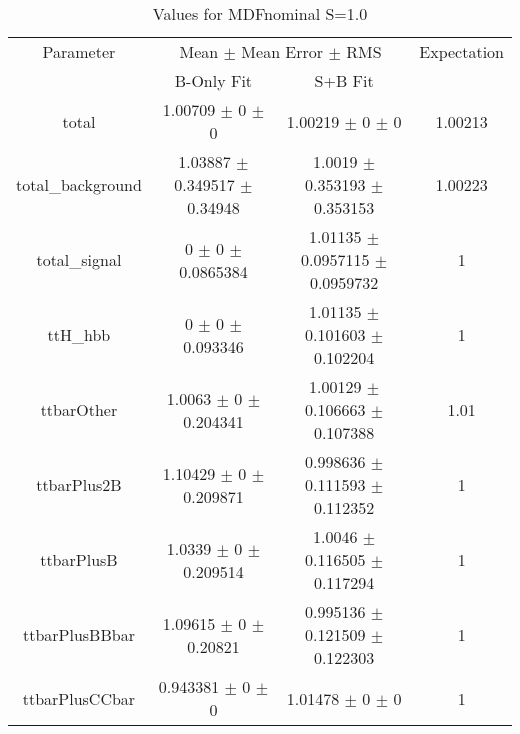 \begin{table}
\centering
\caption{Values for MDFnominal S=1.0}
\begin{tabular}{cccc}
\toprule
Parameter & \multicolumn{2}{c}{Mean $\pm$ Mean Error $\pm$ RMS} & Expectation\\
 & B-Only Fit & S+B Fit & \\
\midrule
total & \num{1.00709} $\pm$ \num{0} $\pm$ \num{0} & \num{1.00219} $\pm$ \num{0} $\pm$ \num{0} & \num{1.00213}\\
total\_background & \num{1.03887} $\pm$ \num{0.349517} $\pm$ \num{0.34948} & \num{1.0019} $\pm$ \num{0.353193} $\pm$ \num{0.353153} & \num{1.00223}\\
total\_signal & \num{0} $\pm$ \num{0} $\pm$ \num{0.0865384} & \num{1.01135} $\pm$ \num{0.0957115} $\pm$ \num{0.0959732} & \num{1}\\
ttH\_hbb & \num{0} $\pm$ \num{0} $\pm$ \num{0.093346} & \num{1.01135} $\pm$ \num{0.101603} $\pm$ \num{0.102204} & \num{1}\\
ttbarOther & \num{1.0063} $\pm$ \num{0} $\pm$ \num{0.204341} & \num{1.00129} $\pm$ \num{0.106663} $\pm$ \num{0.107388} & \num{1.01}\\
ttbarPlus2B & \num{1.10429} $\pm$ \num{0} $\pm$ \num{0.209871} & \num{0.998636} $\pm$ \num{0.111593} $\pm$ \num{0.112352} & \num{1}\\
ttbarPlusB & \num{1.0339} $\pm$ \num{0} $\pm$ \num{0.209514} & \num{1.0046} $\pm$ \num{0.116505} $\pm$ \num{0.117294} & \num{1}\\
ttbarPlusBBbar & \num{1.09615} $\pm$ \num{0} $\pm$ \num{0.20821} & \num{0.995136} $\pm$ \num{0.121509} $\pm$ \num{0.122303} & \num{1}\\
ttbarPlusCCbar & \num{0.943381} $\pm$ \num{0} $\pm$ \num{0} & \num{1.01478} $\pm$ \num{0} $\pm$ \num{0} & \num{1}\\
\bottomrule
\end{tabular}
\end{table}